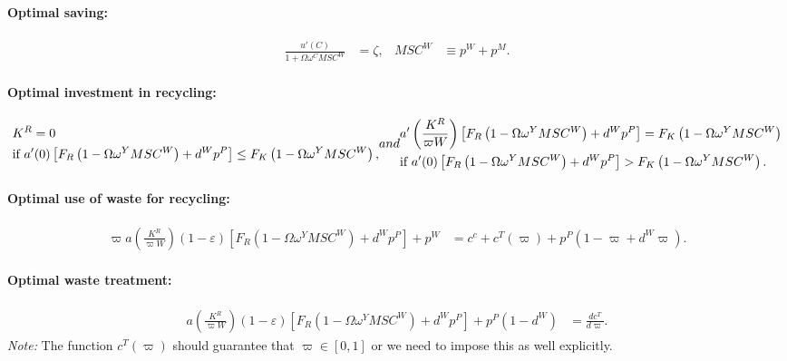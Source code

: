 \paragraph{Optimal saving:}
\begin{align}
\frac{u'(C)}{1 + \Omega\omega^C MSC^W} &= \zeta,
&
MSC^W &\equiv p^W + p^M.
\label{eq:first-best:optimal-saving}
\end{align}

\paragraph{Optimal investment in recycling:}
\begin{subequations}
\begin{align}\label{eq:first-best:recycling-investment-a}
&K^R = 0 \\
&\text{if } a'(0)\left[F_R\left(1-\Omega\omega^Y MSC^W\right) + d^W p^P\right] \le F_K\left(1-\Omega\omega^Y MSC^W\right), \notag
\end{align}
and
\begin{align}\label{eq:first-best:recycling-investment-b}
&a'\left(\frac{K^R}{\varpi W}\right)\left[F_R\left(1-\Omega\omega^Y MSC^W\right) + d^W p^P\right] = F_K\left(1-\Omega\omega^Y MSC^W\right) \\ 
&\text{if } a'(0)\left[F_R\left(1-\Omega\omega^Y MSC^W\right) + d^W p^P\right] > F_K\left(1-\Omega\omega^Y MSC^W\right). \notag
\end{align}
\end{subequations}

\paragraph{Optimal use of waste for recycling:}
\begin{align}
\varpi a\left(\frac{K^R}{\varpi W}\right)(1-\varepsilon)\left[F_R\left(1-\Omega\omega^Y MSC^W\right) + d^W p^P\right] + p^W &= c^c + c^T(\varpi) + p^P\left(1-\varpi+d^W\varpi\right).
\label{eq:first-best:optimal-waste-use}
\end{align}

\paragraph{Optimal waste treatment:}
\begin{align}
a\left(\frac{K^R}{\varpi W}\right)(1-\varepsilon)\left[F_R\left(1-\Omega\omega^Y MSC^W\right) + d^W p^P\right] + p^P\left(1-d^W\right) &= \frac{dc^T}{d\varpi}.
\label{eq:first-best:optimal-waste-treatment}
\end{align}
\textit{Note:} The function $c^T(\varpi)$ should guarantee that $\varpi\in[0,1]$ or we need to impose this as well explicitly. 



